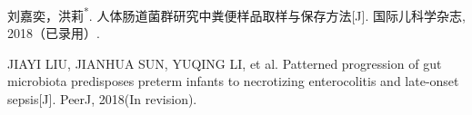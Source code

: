 
\begin{publications}{99}
    \item\textsc{刘嘉奕，洪莉\textsuperscript{*}}. {人体肠道菌群研究中粪便样品取样与保存方法}[J]. 国际儿科学杂志, 2018（已录用）.
    \item\textsc{JIAYI LIU, JIANHUA SUN, YUQING LI}, et al. {Patterned progression of gut microbiota predisposes preterm infants to necrotizing enterocolitis and late-onset sepsis}[J]. PeerJ, 2018(In revision).
\end{publications}
